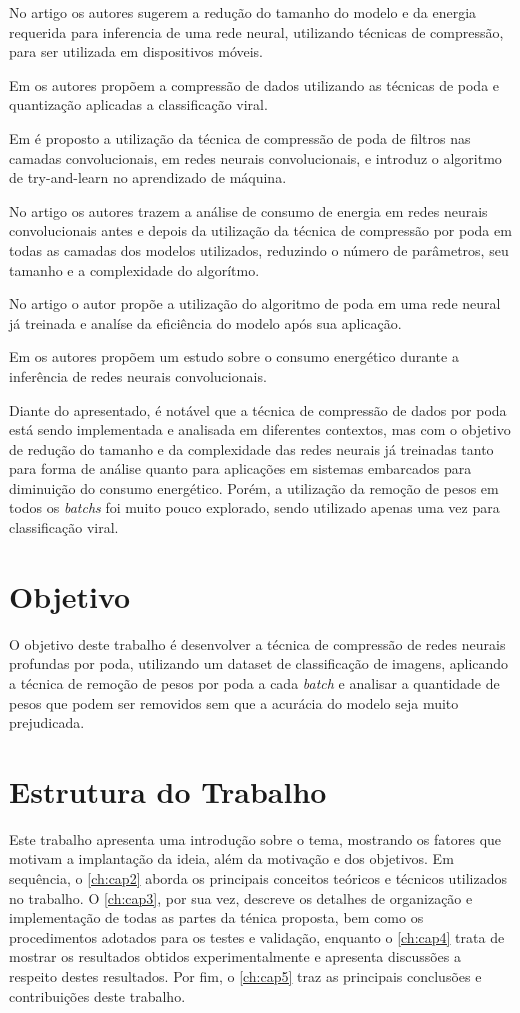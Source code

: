 No artigo \cite{han2015} os autores sugerem a redução do tamanho do modelo e da energia requerida para inferencia de uma rede neural, utilizando técnicas de compressão, para ser utilizada em dispositivos móveis.

Em \cite{fernandes2021} os autores propõem a compressão de dados utilizando as técnicas de poda e quantização aplicadas a classificação viral.

Em \cite{huang2018} é proposto a utilização da técnica de compressão de poda de filtros nas camadas convolucionais, em redes neurais convolucionais, e introduz o algoritmo de try-and-learn no aprendizado de máquina.

No artigo \cite{yang2017} os autores trazem a análise de consumo de energia em redes neurais convolucionais antes e depois da utilização da técnica de compressão por poda em todas as camadas dos modelos utilizados, reduzindo o número de parâmetros, seu tamanho e a  complexidade do algorítmo.

No artigo \cite{reed1993} o autor propõe a utilização do algoritmo de poda em uma rede neural já treinada e analíse da eficiência do modelo após sua aplicação.

Em \cite{nvidea2015} os autores propõem um estudo sobre o consumo energético durante a inferência de redes neurais convolucionais.

Diante do apresentado, é notável que a técnica de compressão de dados por poda está sendo implementada e analisada em diferentes contextos, mas com o  objetivo de redução do tamanho e da complexidade das redes neurais já treinadas tanto para forma de análise quanto para aplicações em sistemas embarcados para diminuição do consumo energético. Porém, a utilização da remoção de pesos em todos os \textit{batchs} foi muito pouco explorado, sendo utilizado apenas uma vez para classificação viral.


\section{Objetivo}
O objetivo deste trabalho é desenvolver a técnica de compressão de redes neurais profundas por poda, utilizando um dataset de classificação de imagens, aplicando a técnica de remoção de pesos por poda a cada \textit{batch} e analisar a quantidade de pesos que podem ser removidos sem que a acurácia do modelo seja muito prejudicada.

\section{Estrutura do Trabalho}
Este trabalho apresenta uma introdução sobre o tema, mostrando os fatores que motivam a implantação da ideia, além da motivação e dos objetivos. Em sequência, o \autoref{ch:cap2} aborda os principais conceitos teóricos e técnicos utilizados no trabalho. O \autoref{ch:cap3}, por sua vez, descreve os detalhes de organização e implementação de todas as partes da ténica proposta, bem como os procedimentos adotados para os testes e validação, enquanto o \autoref{ch:cap4} trata de mostrar os resultados obtidos experimentalmente e apresenta discussões a respeito destes resultados. Por fim, o \autoref{ch:cap5} traz as principais conclusões e contribuições deste trabalho.
